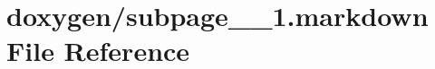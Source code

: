 \hypertarget{subpage__1__1_8markdown}{}\section{doxygen/subpage\+\_\+\_\+1.markdown File Reference}
\label{subpage__1__1_8markdown}
